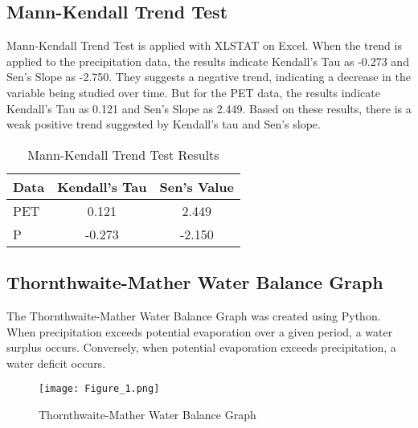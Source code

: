 \documentclass{article}
\begin{document}
\subsection{Mann-Kendall Trend Test}

Mann-Kendall Trend Test is applied with XLSTAT on Excel. When the trend is applied to the precipitation data, the results indicate Kendall's Tau as -0.273 and Sen's Slope as -2.750. They suggests a negative trend, indicating a decrease in the variable being studied over time. But for the PET data, the results indicate Kendall's Tau as 0.121 and Sen's Slope as 2.449. Based on these results, there is a weak positive trend suggested by Kendall's tau and Sen's slope.

\begin{table}[htbp]
\centering
\begin{tabular}{l|c|c}
Data & Kendall's Tau & Sen's Value \\
\hline
PET & 0.121 & 2.449 \\
P & -0.273 & -2.150 \\
\end{tabular}
\caption{\label{tab:widgets}Mann-Kendall Trend Test Results}
\end{table}

\subsection{Thornthwaite-Mather Water Balance Graph}
The Thornthwaite-Mather Water Balance Graph was created using Python. When precipitation exceeds potential evaporation over a given period, a water surplus occurs. Conversely, when potential evaporation exceeds precipitation, a water deficit occurs. 

\begin{figure}[htbp]
    \centering
    \texttt{[image: Figure\_1.png]}
    \caption{Thornthwaite-Mather Water Balance Graph}
    \label{fig:mdata}
\end{figure}
\end{document}

